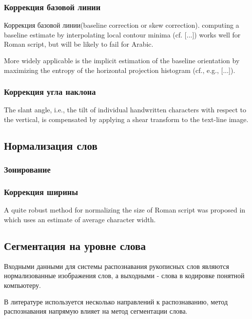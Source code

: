 \subsubsection{Коррекция базовой линии}
Коррекция базовой линии(baseline correction or skew correction). computing a baseline estimate by interpolating local contour minima (cf. [...]) works well for Roman script, but will be likely to fail for Arabic. \cite{plotz2009markov}

More widely applicable is the implicit estimation of the baseline orientation by maximizing the entropy of the horizontal projection histogram (cf., e.g., [...]). \cite{plotz2009markov}

\subsubsection{Коррекция угла наклона}

The slant angle, i.e., the tilt of individual handwritten characters with respect to the vertical, is compensated by applying a shear transform to the text-line image. \cite{plotz2009markov}

\subsection{Нормализация слов}
\subsubsection{Зонирование}
\subsubsection{Коррекция ширины}

A quite robust method for normalizing the size of Roman script was proposed in \cite{madhvanath1999chaincode} which uses an estimate of average character width.

\subsection{Сегментация на уровне слова}

Входными данными для системы распознавания рукописных слов являются нормализованные изображения слов, а выходными - слова в кодировке понятной компьютеру.

В литературе используется несколько направлений к распознаванию, метод распознавания напрямую влияет на метод сегментации слова. 


